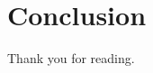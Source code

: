 \documentclass[./main]{subfiles}
\begin{document}
\section{Conclusion}
Thank you for reading.

\end{document}
